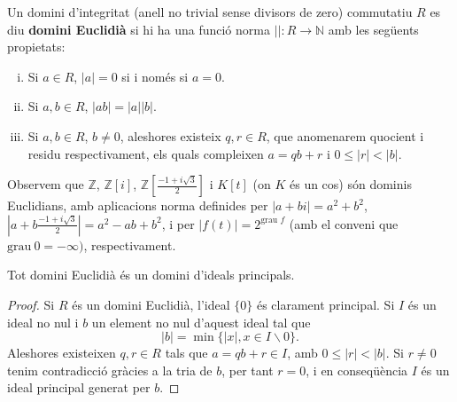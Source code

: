 \begin{definition}
Un domini d'integritat (anell no trivial sense divisors de zero) commutatiu $R$ es diu \textbf{domini Euclidià} si hi ha una funció norma $||:R\rightarrow \mathbb{N}$ amb les següents propietats:
\begin{enumerate}[i)]
\item Si $a\in R$, $|a|=0$ si i només si $a=0$.
\item Si $a,b\in R$, $|ab| = |a||b|$.
\item Si $a,b \in R$, $b\neq 0$, aleshores existeix $q,r \in R$, que anomenarem quocient i residu respectivament, els quals compleixen $a=qb+r$ i $0 \leq |r| < |b|$.
\end{enumerate}
\end{definition}

\begin{obs}
Observem que $\mathbb{Z}$, $\mathbb{Z}[i]$, $\mathbb{Z}[\frac{-1+i\sqrt{3}}{2}]$ i $K[t]$ (on $K$ és un cos) són dominis Euclidians, amb aplicacions norma definides per $|a+bi|=a^2+b^2$, $|a+b\frac{-1+i\sqrt{3}}{2}|=a^2-ab+b^2$, i per $|f(t)|=2^{\text{grau }f}$ (amb el conveni que $\text{grau} \ 0 = -\infty)$, respectivament.
\end{obs}

\begin{prop} \label{EUDesDIP}
Tot domini Euclidià és un domini d'ideals principals.
\end{prop}
\begin{proof}
Si $R$ és un domini Euclidià, l'ideal $\{0\}$ és clarament principal. Si $I$ és un ideal no nul i $b$ un element no nul d'aquest ideal tal que 
$$
|b| = \min \{ |x|, x\in I\backslash 0 \}.
$$
Aleshores existeixen $q,r \in R$ tals que $a=qb+r\in I$, amb $0\leq |r|<|b|$. Si $r\neq 0$ tenim contradicció gràcies a la tria de $b$, per tant $r=0$, i en conseqüència $I$ és un ideal principal generat per $b$.
\end{proof}

